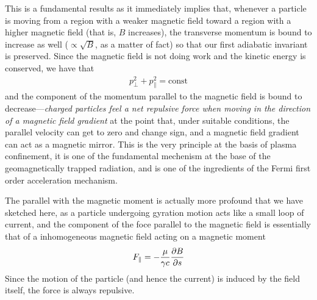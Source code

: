 This is a fundamental results as it immediately implies that, whenever a particle
is moving from a region with a weaker magnetic field toward a region with a
higher magnetic field (that is, $B$ increases), the transverse momentum is bound
to increase as well ($\propto \sqrt{B}$, as a matter of fact) so that our first
adiabatic invariant is preserved. Since the magnetic field is not doing work and
the kinetic energy is conserved, we have that
\begin{align*}
  p_\perp^2 +  p_\parallel^2 = \text{const}
\end{align*}
and the component of the momentum parallel to the magnetic field is bound to
decrease---\emph{charged particles feel a net repulsive force when moving in
the direction of a magnetic field gradient} at the point that, under suitable
conditions, the parallel velocity can get to zero and change sign, and a magnetic
field gradient can act as a magnetic mirror. This is the very principle at the basis
of plasma confinement, it is one of the fundamental mechenism at the base of the
geomagnetically trapped radiation, and is one of the ingredients of the Fermi
first order acceleration mechanism.

The parallel with the magnetic moment is actually more profound that we have
sketched here, as a particle undergoing gyration motion acts like a small loop
of current, and the component of the foce parallel to the magnetic field is
essentially that of a inhomogeneous magnetic field acting on a magnetic moment
\begin{align}
  F_\parallel = -\frac{\mu}{\gamma c}\pdv{B}{s}
\end{align}
Since the motion of the particle (and hence the current) is induced by the field
itself, the force is always repulsive.
